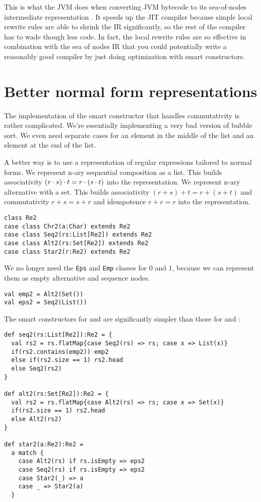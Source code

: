 This is what the JVM does when converting JVM bytecode to its sea-of-nodes intermediate representation \cite{click95}. It speeds up the JIT compiler because simple local rewrite rules are able to shrink the IR significantly, so the rest of the compiler has to wade though less code. In fact, the local rewrite rules are so effective in combination with the sea of nodes IR that you could potentially write a reasonably good compiler by just doing optimization with smart constructors.


\section{Better normal form representations}

The implementation of the smart constructor that handles commutativity is rather complicated. We're essentially implementing a very bad version of bubble sort. We even need separate cases for an element in the middle of the list and an element at the end of the list.

A better way is to use a representation of regular expressions tailored to normal forms. We represent n-ary sequential composition as a list. This builds associativity $(r \cdot s) \cdot t = r \cdot (s \cdot t)$ into the representation. We represent n-ary alternative with a set. This builds associativity $(r + s) + t = r + (s + t)$ and commutativity $r + s = s + r$ and idempotence $r + r = r$ into the representation.

\begin{lstlisting}
class Re2
case class Chr2(a:Char) extends Re2
case class Seq2(rs:List[Re2]) extends Re2
case class Alt2(rs:Set[Re2]) extends Re2
case class Star2(r:Re2) extends Re2
\end{lstlisting}

We no longer need the \lstinline|Eps| and \lstinline|Emp| classes for $0$ and $1$, because we can represent them as empty alternative and sequence nodes.

\begin{lstlisting}
val emp2 = Alt2(Set())
val eps2 = Seq2(List())
\end{lstlisting}

The smart constructors for  and  are significantly simpler than those for  and :

\begin{lstlisting}
def seq2(rs:List[Re2]):Re2 = {
  val rs2 = rs.flatMap{case Seq2(rs) => rs; case x => List(x)}
  if(rs2.contains(emp2)) emp2
  else if(rs2.size == 1) rs2.head
  else Seq2(rs2)
}

def alt2(rs:Set[Re2]):Re2 = {
  val rs2 = rs.flatMap{case Alt2(rs) => rs; case x => Set(x)}
  if(rs2.size == 1) rs2.head
  else Alt2(rs2)
}

def star2(a:Re2):Re2 =
  a match {
    case Alt2(rs) if rs.isEmpty => eps2
    case Seq2(rs) if rs.isEmpty => eps2
    case Star2(_) => a
    case _ => Star2(a)
  }
\end{lstlisting}

